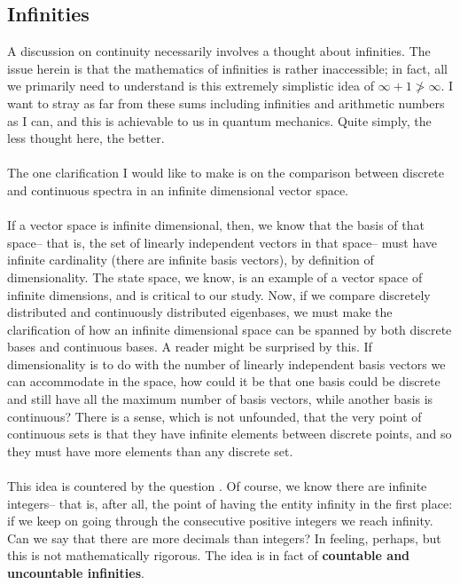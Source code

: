 \subsection{Infinities}
A discussion on continuity necessarily involves a thought about infinities. The issue herein is that the mathematics of infinities is rather inaccessible; in fact, all we primarily need to understand is this extremely simplistic idea of $\infty + 1 \ngtr \infty$. I want to stray as far from these sums including infinities and arithmetic numbers as I can, and this is achievable to us in quantum mechanics. Quite simply, the less thought here, the better.
\\\\
The one clarification I would like to make is on the comparison between discrete and continuous spectra in an infinite dimensional vector space.
\\\\
If a vector space is infinite dimensional, then, we know that the basis of that space-- that is, the set of linearly independent vectors in that space-- must have infinite cardinality (there are infinite basis vectors), by definition of dimensionality. The state space, we know, is an example of a vector space of infinite dimensions, and is critical to our study. Now, if we compare discretely distributed and continuously distributed eigenbases, we must make the clarification of how an infinite dimensional space can be spanned by both discrete bases and continuous bases. A reader might be surprised by this. If dimensionality is to do with the number of linearly independent basis vectors we can accommodate in the space, how could it be that one basis could be discrete and still have all the maximum number of basis vectors, while another basis is continuous? There is a sense, which is not unfounded, that the very point of continuous sets is that they have infinite elements between discrete points, and so they must have more elements than any discrete set.
\\\\
This idea is countered by the question . Of course, we know there are infinite integers-- that is, after all, the point of having the entity infinity in the first place: if we keep on going through the consecutive positive integers we reach infinity. Can we say that there are more decimals than integers? In feeling, perhaps, but this is not mathematically rigorous. The idea is in fact of \textbf{countable and uncountable infinities}.
\\\\
